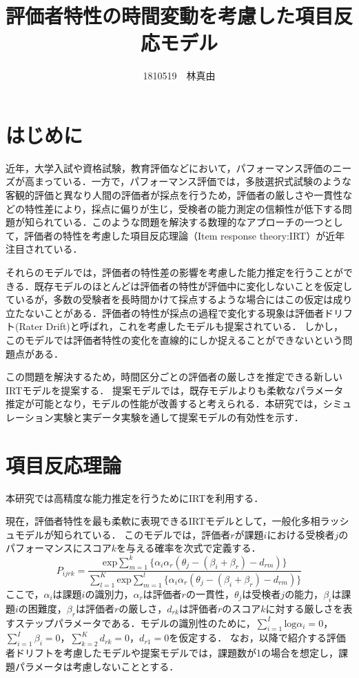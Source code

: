 \documentclass[dvipdfmx, twocolumn, a4paper]{hcresume}
\title{\bf 評価者特性の時間変動を考慮した項目反応モデル}
\author{1810519　林真由}
\begin{document}
\maketitle
\pagestyle{empty}
\thispagestyle{empty}
\section{はじめに}
近年，大学入試や資格試験，教育評価などにおいて，パフォーマンス評価のニーズが高まっている．一方で，パフォーマンス評価では，多肢選択式試験のような客観的評価と異なり人間の評価者が採点を行うため，評価者の厳しさや一貫性などの特性差により，採点に偏りが生じ，受検者の能力測定の信頼性が低下する問題が知られている．このような問題を解決する数理的なアプローチの一つとして，評価者の特性を考慮した項目反応理論（Item response theory:IRT）\cite{IRTLord}が近年注目されている．

それらのモデルでは，評価者の特性差の影響を考慮した能力推定を行うことができる．既存モデルのほとんどは評価者の特性が評価中に変化しないことを仮定しているが，多数の受験者を長時間かけて採点するような場合にはこの仮定は成り立たないことがある．評価者の特性が採点の過程で変化する現象は評価者ドリフト(Rater Drift)と呼ばれ，これを考慮したモデルも提案されている．
しかし，このモデルでは評価者特性の変化を直線的にしか捉えることができないという問題点がある．

この問題を解決するため，時間区分ごとの評価者の厳しさを推定できる新しいIRTモデルを提案する．
提案モデルでは，既存モデルよりも柔軟なパラメータ推定が可能となり，モデルの性能が改善すると考えられる．本研究では，シミュレーション実験と実データ実験を通して提案モデルの有効性を示す．

\section{項目反応理論}
本研究では高精度な能力推定を行うためにIRTを利用する．

現在，評価者特性を最も柔軟に表現できるIRTモデルとして，一般化多相ラッシュモデルが知られている\cite{g-MFRM}．
このモデルでは，評価者$r$が課題$i$における受検者$j$のパフォーマンスにスコア$k$を与える確率を次式で定義する．
\begin{equation}
  P_{ijrk}=\frac{\mathrm{exp}\sum_{m=1}^{k}\{\alpha_i\alpha_r(\theta_{j}-(\beta_{i}+\beta_{r})-d_{rm})\}}{\sum_{l=1}^{K}\mathrm{exp}\sum_{m=1}^{l}\{\alpha_i\alpha_r(\theta_{j}-(\beta_{i}+\beta_{r})-d_{rm})\}}
\end{equation}
ここで，$\alpha_i$は課題$i$の識別力，$\alpha_r$は評価者$r$の一貫性，$\theta_j$は受検者$j$の能力，$\beta_i$は課題$i$の困難度，$\beta_r$は評価者$r$の厳しさ，$d_{rk}$は評価者$r$のスコア$k$に対する厳しさを表すステップパラメータである．モデルの識別性のために，$\sum^{I}_{i=1}{\mathrm{log}\alpha_i}=0$，$\sum^{I}_{i=1}{\beta_i}=0$，$\sum^{K}_{k=2}{d_{rk}}=0$，$d_{r1}=0$を仮定する．
なお，以降で紹介する評価者ドリフトを考慮したモデルや提案モデルでは，課題数が1の場合を想定し，課題パラメータは考慮しないこととする．
\end{document}
